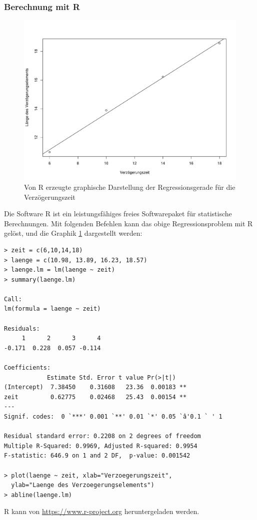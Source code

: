 \subsubsection{Berechnung mit R}
\begin{figure}
\begin{center}
\includegraphics[width=0.7\hsize]{graphics/verzoegerungszeit}
\end{center}
\caption{Von R erzeugte graphische Darstellung der Regressionsgerade
für die Verzögerungszeit\label{verzoegerungszeit}}
\end{figure}
Die Software R
ist ein leistungsfähiges freies Softwarepaket für statistische
Berechnungen.
Mit folgenden Befehlen kann das obige Regressionsproblem
mit R gelöst, und die Graphik \ref{verzoegerungszeit} dargestellt
werden:

{\footnotesize
\begin{verbatim}
> zeit = c(6,10,14,18)
> laenge = c(10.98, 13.89, 16.23, 18.57)
> laenge.lm = lm(laenge ~ zeit)
> summary(laenge.lm)

Call:
lm(formula = laenge ~ zeit)

Residuals:
     1      2      3      4 
-0.171  0.228  0.057 -0.114 

Coefficients:
            Estimate Std. Error t value Pr(>|t|)   
(Intercept)  7.38450    0.31608   23.36  0.00183 **
zeit         0.62775    0.02468   25.43  0.00154 **
---
Signif. codes:  0 `***' 0.001 `**' 0.01 `*' 0.05 `â'0.1 ` ' 1 

Residual standard error: 0.2208 on 2 degrees of freedom
Multiple R-Squared: 0.9969,	Adjusted R-squared: 0.9954 
F-statistic: 646.9 on 1 and 2 DF,  p-value: 0.001542 

> plot(laenge ~ zeit, xlab="Verzoegerungszeit",
  ylab="Laenge des Verzoegerungselements")
> abline(laenge.lm)
\end{verbatim}
}
R kann von \url{https://www.r-project.org} heruntergeladen werden.






